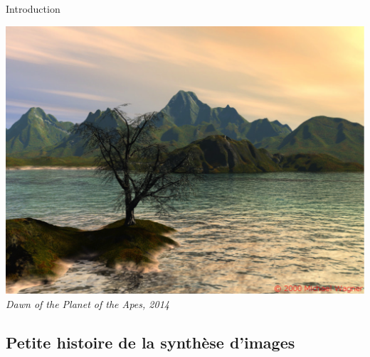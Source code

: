 \begin{frame}{Introduction}
\begin{center}
\includegraphics[height=\textheight]{figs/wagner00.png}
\emph{Dawn of the Planet of the Apes, 2014}
\end{center}
\end{frame}

\subsection{Petite histoire de la synthèse d'images}

